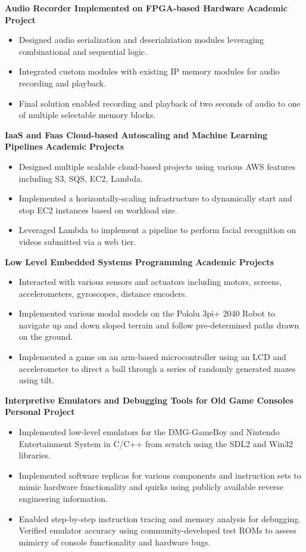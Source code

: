 \textbf{Audio Recorder Implemented on FPGA-based Hardware} \hfill \textbf{Academic Project}
\begin{itemize}
    \item Designed audio serialization and deserialziation modules leveraging combinational and sequential logic.
    \item Integrated custom modules with existing IP memory modules for audio recording and playback.
    \item Final solution enabled recording and playback of two seconds of audio to one of multiple selectable memory blocks.
\end{itemize}

\textbf{IaaS and Faas Cloud-based Autoscaling and Machine Learning Pipelines} \hfill \textbf{Academic Projects}
\begin{itemize}
    \item Designed multiple scalable cloud-based projects using various AWS features including S3, SQS, EC2, Lambda.
    \item Implemented a horizontally-scaling infrastructure to dynamically start and stop EC2 instances based on workload size.
    \item Leveraged Lambda to implement a pipeline to perform facial recognition on videos submitted via a web tier.
\end{itemize}

\textbf{Low Level Embedded Systems Programming} \hfill \textbf{Academic Projects}
\begin{itemize}
    \item Interacted with various sensors and actuators including motors, screens, accelerometers, gyroscopes, distance encoders.
    \item Implemented various modal models on the Pololu 3pi+ 2040 Robot to navigate up and down sloped terrain and follow pre-determined paths drawn on the ground.
    \item Implemented a game on an arm-based microcontroller using an LCD and accelerometer to direct a ball through a series of randomly generated mazes using tilt.
\end{itemize}

\textbf{Interpretive Emulators and Debugging Tools for Old Game Consoles} \hfill \textbf{Personal Project}
\begin{itemize}
    \item Implemented low-level emulators for the DMG-GameBoy and Nintendo Entertainment System in C/C++ from scratch using the SDL2 and Win32 libraries.
    \item Implemented software replicas for various components and instruction sets to mimic hardware functionality and quirks using publicly available reverse engineering information.
    \item Enabled step-by-step instruction tracing and memory analysis for debugging. Verified emulator accuracy using community-developed test ROMs to assess mimicry of console functionality and hardware bugs.
\end{itemize}

